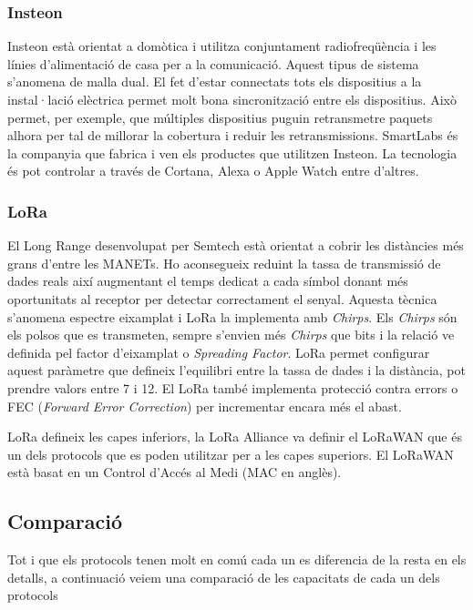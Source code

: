 \subsubsection{Insteon}
Insteon està orientat a domòtica i utilitza conjuntament radiofreqüència i les línies d'alimentació de casa per a la comunicació.
Aquest tipus de sistema s'anomena de malla dual.
El fet d'estar connectats tots els dispositius a la instal·lació elèctrica permet molt bona sincronització entre els dispositius.
Això permet, per exemple, que múltiples dispositius puguin retransmetre paquets alhora per tal de millorar la cobertura i reduir les retransmissions.
SmartLabs és la companyia que fabrica i ven els productes que utilitzen Insteon.
La tecnologia és pot controlar a través de Cortana, Alexa o Apple Watch entre d'altres.

\subsubsection{LoRa}
El Long Range desenvolupat per Semtech està orientat a cobrir les distàncies més grans d'entre les MANETs.
Ho aconsegueix reduint la tassa de transmissió de dades reals així augmentant el temps dedicat a cada símbol donant més oportunitats al receptor per detectar correctament el senyal.
Aquesta tècnica s'anomena espectre eixamplat i LoRa la implementa amb \textit{Chirps}.
Els \textit{Chirps} són els polsos que es transmeten, sempre s'envien més \textit{Chirps} que bits i la relació ve definida pel factor d'eixamplat o \textit{Spreading Factor}.
LoRa permet configurar aquest paràmetre que defineix l'equilibri entre la tassa de dades i la distància, pot prendre valors entre 7 i 12.
El LoRa també implementa protecció contra errors o FEC (\textit{Forward Error Correction}) per incrementar encara més el abast.

LoRa defineix les capes inferiors, la LoRa Alliance va definir el LoRaWAN que és un dels protocols que es poden utilitzar per a les capes superiors. El LoRaWAN està basat en un Control d'Accés al Medi (MAC en anglès).


\subsection{Comparació}
Tot i que els protocols tenen molt en comú cada un es diferencia de la resta en els detalls, a continuació veiem una comparació de les capacitats de cada un dels protocols

